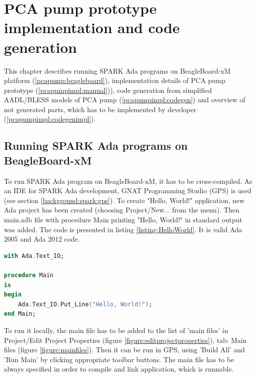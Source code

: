 
\cleardoublepage


\chapter{PCA pump prototype implementation and code generation}
\label{pcapumpimpl}

This chapter describes running SPARK Ada programs on BeagleBoard-xM platform (\ref{pcapump:beagleboard}), implementation details of PCA pump prototype (\ref{pcapumpimpl:manual})), code generation from simplified AADL/BLESS models of PCA pump (\ref{pcapumpimpl:codegen}) and overview of not generated parts, which has to be implemented by developer (\ref{pcapumpimpl:codegenimpl}).


\section{Running SPARK Ada programs on BeagleBoard-xM}
\label{pcapumpimpl:beagleboard}

To run SPARK Ada program on BeagleBoard-xM, it has to be cross-compiled. As an IDE for SPARK Ada development, GNAT Programming Studio (GPS) is used (see section \ref{background:spark:gps}). To create "Hello, World!" application, new Ada project has been created (choosing Project/New... from the menu). Then main.adb file with procedure Main printing "Hello, World!" in standard output was added. The code is presented in listing \ref{listing:HelloWorld}. It is valid Ada 2005 and Ada 2012 code.

\begin{lstlisting}[language=ada, frame=single, gobble=0, caption={"Hello World" in Ada}, label={listing:HelloWorld}]
with Ada.Text_IO;

procedure Main
is
begin
    Ada.Text_IO.Put_Line("Hello, World!");    
end Main;
\end{lstlisting} 

To run it locally, the main file has to be added to the list of 'main files' in Project/Edit Project Properties (figure \ref{figure:editprojectproperties}), tab: Main files (figure \ref{figure:mainfiles}). Then it can be run in GPS, using 'Build All' and 'Run Main' by clicking appropriate toolbar buttons. The main file has to be always specified in order to compile and link application, which is runnable.


